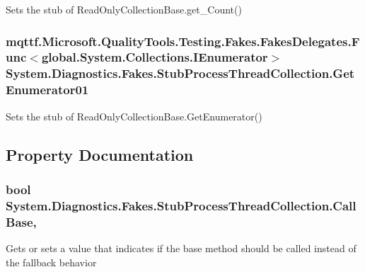 Sets the stub of Read\-Only\-Collection\-Base.\-get\-\_\-\-Count()

\hypertarget{class_system_1_1_diagnostics_1_1_fakes_1_1_stub_process_thread_collection_a14ddea2ff119031b4f7a00c336427e55}{
\subsubsection[{Get\-Enumerator01}]{\setlength{\rightskip}{0pt plus 5cm}mqttf.\-Microsoft.\-Quality\-Tools.\-Testing.\-Fakes.\-Fakes\-Delegates.\-Func$<$global.\-System.\-Collections.\-I\-Enumerator$>$ System.\-Diagnostics.\-Fakes.\-Stub\-Process\-Thread\-Collection.\-Get\-Enumerator01}}\label{class_system_1_1_diagnostics_1_1_fakes_1_1_stub_process_thread_collection_a14ddea2ff119031b4f7a00c336427e55}


Sets the stub of Read\-Only\-Collection\-Base.\-Get\-Enumerator()



\subsection{Property Documentation}
\hypertarget{class_system_1_1_diagnostics_1_1_fakes_1_1_stub_process_thread_collection_a3dd75d4a75441fb01a6a4ba1e18af509}{
\subsubsection[{Call\-Base}]{\setlength{\rightskip}{0pt plus 5cm}bool System.\-Diagnostics.\-Fakes.\-Stub\-Process\-Thread\-Collection.\-Call\-Base\hspace{0.3cm}{\ttfamily [get]}, {\ttfamily [set]}}}\label{class_system_1_1_diagnostics_1_1_fakes_1_1_stub_process_thread_collection_a3dd75d4a75441fb01a6a4ba1e18af509}


Gets or sets a value that indicates if the base method should be called instead of the fallback behavior

